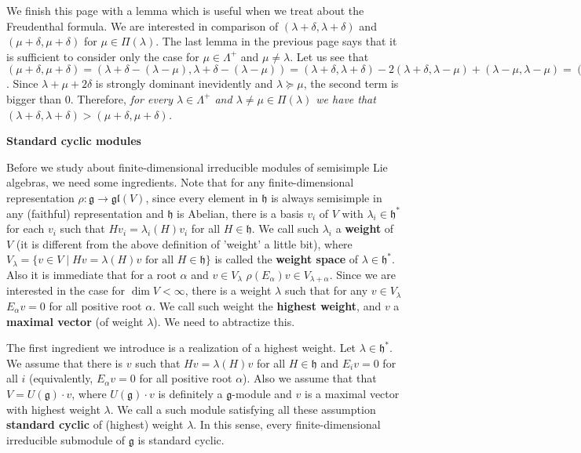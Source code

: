 \documentclass{article}
\newcommand{\SBar}{\;|\;}
\newcommand{\lie}[1]{\mathfrak{#1}}
\begin{document}
We finish this page with a lemma which is useful when we treat about the Freudenthal formula.
We are interested in comparison of $(\lambda + \delta, \lambda + \delta)$ and $(\mu + \delta, \mu + \delta)$ for $\mu \in \Pi(\lambda)$.
The last lemma in the previous page says that it is sufficient to consider only the case for $\mu \in \Lambda^+$ and $\mu \ne \lambda$.
Let us see that $(\mu + \delta, \mu + \delta) = (\lambda + \delta - (\lambda - \mu), \lambda + \delta - (\lambda - \mu)) = (\lambda + \delta, \lambda + \delta) - 2(\lambda + \delta, \lambda - \mu) + (\lambda - \mu, \lambda - \mu) = (\lambda + \delta, \lambda + \delta) - (\lambda + \mu + 2\delta, \lambda - \mu)$.
Since $\lambda + \mu + 2\delta$ is strongly dominant inevidently and $\lambda \succeq \mu$, the second term is bigger than 0.
Therefore, \textit{for every $\lambda \in \Lambda^+$ and $\lambda \ne \mu \in \Pi(\lambda)$ we have that $(\lambda + \delta, \lambda + \delta) > (\mu + \delta, \mu + \delta)$.}

\newpage

\textbf{Standard cyclic modules}

Before we study about finite-dimensional irreducible modules of semisimple Lie algebras, we need some ingredients.
Note that for any finite-dimensional representation $\rho : \lie{g} \to \lie{gl}(V)$, since every element in $\lie{h}$ is always semisimple in any (faithful) representation and $\lie{h}$ is Abelian, there is a basis $v_i$ of $V$ with $\lambda_i \in \lie{h}^*$ for each $v_i$ such that $Hv_i = \lambda_i(H) v_i$ for all $H \in \lie{h}$.
We call such $\lambda_i$ a \textbf{weight} of $V$ (it is different from the above definition of 'weight' a little bit), where $V_\lambda = \{v \in V \SBar Hv = \lambda(H) v \textrm{ for all $H \in \lie{h}$}\}$ is called the \textbf{weight space} of $\lambda \in \lie{h}^*$.
Also it is immediate that for a root $\alpha$ and $v \in V_\lambda$ $\rho(E_\alpha) v \in V_{\lambda + \alpha}$.
Since we are interested in the case for $\dim{V} < \infty$, there is a weight $\lambda$ such that for any $v \in V_\lambda$ $E_\alpha v = 0$ for all positive root $\alpha$.
We call such weight the \textbf{highest weight}, and $v$ a \textbf{maximal vector} (of weight $\lambda$).
We need to abtractize this.

The first ingredient we introduce is a realization of a highest weight.
Let $\lambda \in \lie{h}^*$.
We assume that there is $v$ such that $Hv = \lambda(H) v$ for all $H \in \lie{h}$ and $E_i v = 0$ for all $i$ (equivalently, $E_\alpha v = 0$ for all positive root $\alpha$).
Also we assume that that $V = U(\lie{g}) \cdot v$, where $U(\lie{g}) \cdot v$ is definitely a $\lie{g}$-module and $v$ is a maximal vector with highest weight $\lambda$.
We call a such module satisfying all these assumption \textbf{standard cyclic} of (highest) weight $\lambda$.
In this sense, every finite-dimensional irreducible submodule of $\lie{g}$ is standard cyclic.
\end{document}
